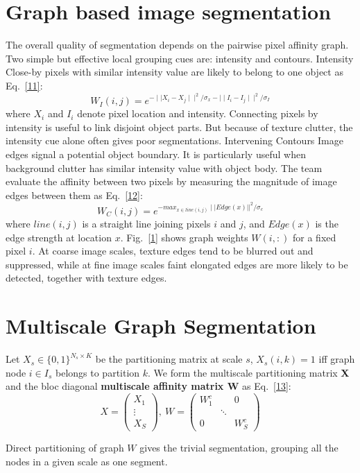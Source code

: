 \documentclass[10pt,twocolumn,letterpaper]{article}
\begin{document}
\section{Graph based image segmentation}
The overall quality of segmentation depends on the pairwise pixel affinity graph. Two simple but effective local grouping cues are: intensity and contours. Intensity Close-by pixels with similar intensity value are likely to belong to one object as Eq.~\ref{11}:
\begin{equation}\label{11}
W_I(i,j)=e^{-\mid\mid X_i-X_j\mid\mid^2/\sigma_x-\mid\mid I_i-I_j\mid\mid^2/\sigma_I}
\end{equation}
where $X_i$ and $I_i$ denote pixel location and intensity. Connecting pixels by intensity is useful to link disjoint object parts. But because of texture clutter, the intensity cue alone often gives poor segmentations. Intervening Contours Image edges signal a potential object boundary. It is particularly useful when background clutter has similar intensity value with object body. The team evaluate the affinity between two pixels by measuring the magnitude of image edges between them as Eq.~\ref{12}:
\begin{equation}\label{12}
W_C(i,j)=e^{-max_{x\in line(i,j)}\mid\mid Edge(x)||^2/\sigma_c}
\end{equation}
where $line(i,j)$ is a straight line joining pixels $i$ and $j$, and $Edge(x)$ is the edge strength at location $x$. Fig.~\ref{1}  shows graph weights $W(i,:)$ for a fixed pixel $i$. At coarse image scales, texture edges tend to be blurred out and suppressed, while at fine image scales faint elongated edges are more likely to be detected, together with texture edges.
\section{Multiscale Graph Segmentation}
Let $X_s\in\{0,1\}^{N_s\times K}$ be the partitioning matrix at scale $s$, $X_s(i,k)=1$ iff graph node $i\in I_s$ belongs to partition $k$. We form the multiscale partitioning matrix \textbf{X} and the bloc diagonal \textbf{multiscale affinity matrix W}  as Eq.~\ref{13}:
\begin{equation}\label{13}
X=\left(\begin{array}{c} X_1\\ \vdots \\ X_S \end{array} \right),~W=\left(\begin{array}{ccc} W_1^c & & 0\\  & \ddots &  \\ 0 & & W_S^c \end{array} \right)
\end{equation}
\par
Direct partitioning of graph $W$ gives the trivial segmentation, grouping all the nodes in a given scale as one segment. 
{\small


}
\end{document}
